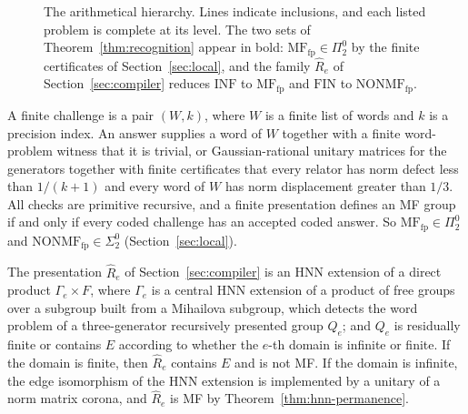 \documentclass[11pt]{amsart}
\theoremstyle{remark}
\theoremstyle{plain}
\begin{document}
\begin{figure}[htb]
\centering
{}
\caption{The arithmetical hierarchy.  Lines indicate inclusions, and each
listed problem is complete at its level.  The two sets of
Theorem~\ref{thm:recognition} appear in bold:
$\mathrm{MF}_{\mathrm{fp}}\in\Pi^0_2$ by the finite certificates of
Section~\ref{sec:local}, and the family $\widehat R_e$ of
Section~\ref{sec:compiler} reduces $\mathrm{INF}$ to
$\mathrm{MF}_{\mathrm{fp}}$ and $\mathrm{FIN}$ to
$\mathrm{NONMF}_{\mathrm{fp}}$.}
\label{fig:levels}
\end{figure}

A finite challenge is a pair $(W,k)$, where $W$ is a finite list of words
and $k$ is a precision index.  An answer supplies a word of $W$ together
with a finite word-problem witness that it is trivial, or Gaussian-rational
unitary matrices for the generators together with finite certificates that
every relator has norm defect less than $1/(k+1)$ and every word of $W$ has
norm displacement greater than $1/3$.  All checks are primitive recursive,
and a finite presentation defines an MF group if and only if every coded
challenge has an accepted coded answer.  So
$\mathrm{MF}_{\mathrm{fp}}\in\Pi^0_2$ and
$\mathrm{NONMF}_{\mathrm{fp}}\in\Sigma^0_2$
(Section~\ref{sec:local}).

The presentation $\widehat R_e$ of Section~\ref{sec:compiler} is an HNN
extension of a direct product $\Gamma_e\times F$, where $\Gamma_e$ is a
central HNN extension of a product of free groups over a subgroup built from
a Mihailova subgroup, which detects the word problem of a three-generator
recursively presented group $Q_e$; and $Q_e$ is residually finite or
contains $E$ according to whether the $e$-th domain is infinite or finite.  If the domain is finite, then $\widehat R_e$ contains
$E$ and is not MF\@.  If the domain is infinite, the edge isomorphism of the
HNN extension is implemented by a unitary of a norm matrix corona, and
$\widehat R_e$ is MF by Theorem~\ref{thm:hnn-permanence}.
\end{document}

